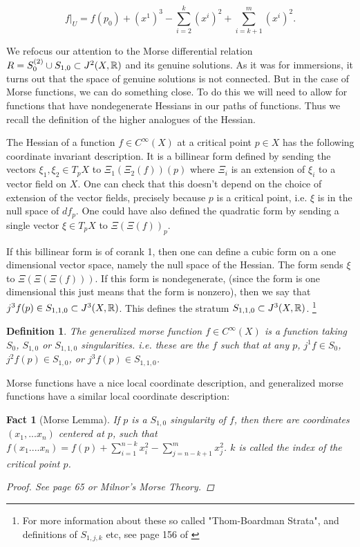 \documentclass{article}
\newtheorem{fact}[theorem]{Fact}
\newtheorem{definition}[theorem]{Definition}
\newtheorem{proposed work}[theorem]{Proposed Work}
\begin{document}
$$f|_{U}=f(p_0)+(x^1)^3-\sum_{i=2}^{k}(x^i)^2+\sum_{i=k+1}^{m}(x^i)^2.$$


We refocus our attention to the Morse differential relation $R=S^{(2)}_0 \cup S_{1,0} \subset J^2(X,\mathbb R)$ and its genuine solutions.  As it was for immersions, it turns out that the space of genuine solutions is not connected.  But in the case of Morse functions, we can do something close.  To do this we will need to allow for functions that have nondegenerate Hessians in our paths of functions. Thus we recall the definition of the higher analogues of the Hessian.

The Hessian of a function $f \in C^\infty(X)$ at a critical point $p \in X$ has the following coordinate invariant description.  It is a billinear form defined by sending the vectors $\xi_1, \xi_2 \in T_pX$ to $\Xi_1(\Xi_2(f))(p)$ where $\Xi_i$ is an extension of $\xi_i$ to a vector field on $X$.  One can check that this doesn't depend on the choice of extension of the vector fields, precisely because $p$ is a critical point, i.e. $\xi$ is in the null space of $df_p$.  One could have also defined the quadratic form by sending a single vector $\xi \in T_pX$ to $\Xi(\Xi(f))_p$.

If this billinear form is of corank 1, then one can define a cubic form on a one dimensional vector space, namely the null space of the Hessian.  The form sends $\xi$ to $\Xi(\Xi(\Xi(f)))$.  If this form is nondegenerate, (since the form is one dimensional this just means that the form is nonzero), then we say that $j^3f(p) \in S_{1,1,0}\subset J^3(X,\mathbb R)$.  This defines the stratum $S_{1,1,0} \subset J^3(X,\mathbb R)$.   \footnote{ For more information about these so called "Thom-Boardman Strata", and definitions of $S_{1,j,k}$ etc, see page 156 of \cite{strata}}

\begin{definition}
The generalized morse function $f \in C^\infty(X)$ is a function taking $S_0$, $S_{1,0}$ or $S_{1,1,0}$ singularities.  i.e. these are the $f$ such that at any $p$, $j^1f \in S_0$, $j^2f(p) \in S_{1,0}$, or $j^3f(p) \in S_{1,1,0}$.
\end{definition}

Morse functions have a nice local coordinate description, and generalized morse functions have a similar local coordinate description:

\begin{fact}[Morse Lemma]

If $p$ is a $S_{1,0}$ singularity of $f$, then there are coordinates $(x_1,...x_n)$ centered at $p$, such that $f(x_1....x_n)=f(p)+ \sum_{i=1}^{n-k} x_i^2- \sum_{j=n-k+1}^m x_j^2$.  $k$ is called the index of the critical point $p$.

\begin{proof}
See \cite{strata} page 65 or Milnor's Morse Theory.
\end{proof}
\end{fact}
\end{document}
